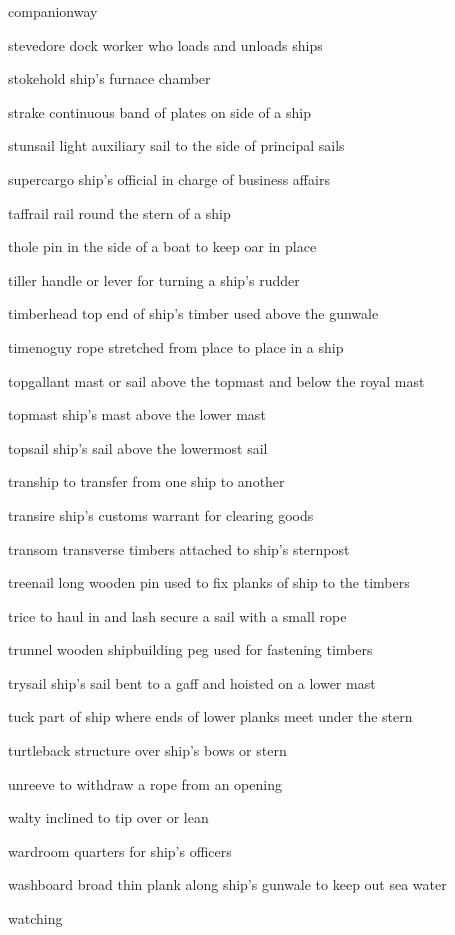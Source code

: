 \documentclass[
  11pt,
  msmallroyalvopaper
]{memoir}
\begin{document}
\begin{labeling}{companionway}
\item[stevedore]
dock worker who loads and unloads ships
\item[stokehold]
ship's furnace chamber
\item[strake]
continuous band of plates on side of a ship
\item[stunsail]
light auxiliary sail to the side of principal sails
\item[supercargo]
ship's official in charge of business affairs
\item[taffrail]
rail round the stern of a ship
\item[thole]
pin in the side of a boat to keep oar in place
\item[tiller]
handle or lever for turning a ship's rudder
\item[timberhead]
top end of ship's timber used above the gunwale
\item[timenoguy]
rope stretched from place to place in a ship
\item[topgallant]
mast or sail above the topmast and below the royal mast
\item[topmast]
ship's mast above the lower mast
\item[topsail]
ship's sail above the lowermost sail
\item[tranship]
to transfer from one ship to another
\item[transire]
ship's customs warrant for clearing goods
\item[transom]
transverse timbers attached to ship's sternpost
\item[treenail]
long wooden pin used to fix planks of ship to the timbers
\item[trice]
to haul in and lash secure a sail with a small rope
\item[trunnel]
wooden shipbuilding peg used for fastening timbers
\item[trysail]
ship's sail bent to a gaff and hoisted on a lower mast
\item[tuck]
part of ship where ends of lower planks meet under the stern
\item[turtleback]
structure over ship's bows or stern
\item[unreeve]
to withdraw a rope from an opening
\item[walty]
inclined to tip over or lean
\item[wardroom]
quarters for ship's officers
\item[washboard]
broad thin plank along ship's gunwale to keep out sea water
\item[watching]

\end{labeling}
\end{document}
